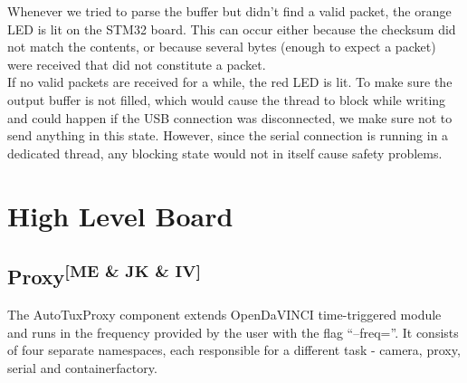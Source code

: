 \noindent
Whenever we tried to parse the buffer but didn't find a valid packet, the orange
LED is lit on the STM32 board. This can occur either because the checksum did
not match the contents, or because several bytes (enough to expect a packet)
were received that did not constitute a packet.\\

\noindent
If no valid packets are received for a while, the red LED is lit. To make sure
the output buffer is not filled, which would cause the thread to block while
writing and could happen if the USB connection was disconnected, we make sure
not to send anything in this state. However, since the serial connection is
running in a dedicated thread, any blocking state would not in itself cause
safety problems.

\section{High Level Board}
\subsection[Proxy]{Proxy\textsuperscript{[ME \& JK \& IV]}}
The AutoTuxProxy component extends OpenDaVINCI time-triggered module and runs in
the frequency provided by the user with the flag ``--freq=''. It consists of
four separate namespaces, each responsible for a different task - camera, proxy,
serial and containerfactory.\\

